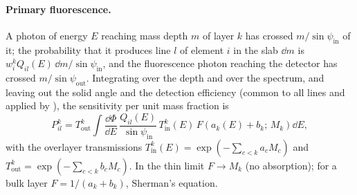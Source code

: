 \paragraph{Primary fluorescence.} A photon of energy $E$ reaching mass depth $m$ of layer
$k$ has crossed $m/\sin\psi_\mathrm{in}$ of it; the probability that it produces line $l$ of
element $i$ in the slab $\dd m$ is $w_i^k Q_{il}(E)\,\dd m/\sin\psi_\mathrm{in}$, and the
fluorescence photon reaching the detector has crossed $m/\sin\psi_\mathrm{out}$. Integrating
over the depth and over the spectrum, and leaving out the solid angle and the detection
efficiency (common to all lines and applied by ), the
sensitivity per unit mass fraction is
\begin{equation}
  P_{il}^k = T_\mathrm{out}^k \int \frac{\dd\Phi}{\dd E}\,\frac{Q_{il}(E)}{\sin\psi_\mathrm{in}}\,
  T_\mathrm{in}^k(E)\,F\!\left(a_k(E)+b_k;\,M_k\right)\dd E,
  \label{eq:primary}
\end{equation}
with the overlayer transmissions $T_\mathrm{in}^k(E) = \exp(-\sum_{c<k}a_c M_c)$ and
$T_\mathrm{out}^k = \exp(-\sum_{c<k}b_c M_c)$. In the thin limit $F \to M_k$ (no
absorption); for a bulk layer $F = 1/(a_k+b_k)$, Sherman's equation.

